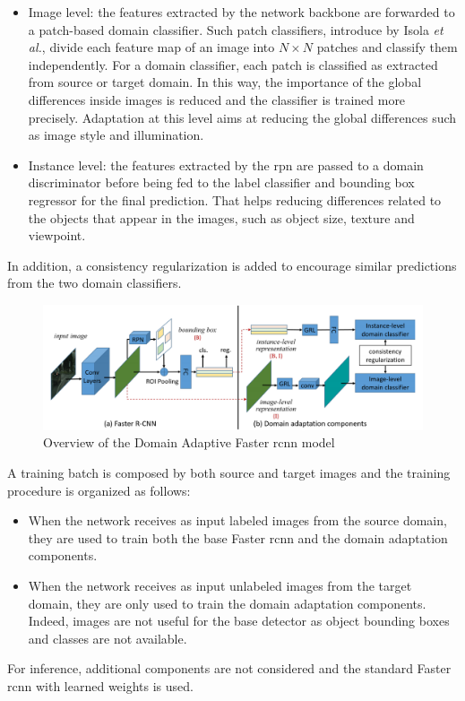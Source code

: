 \documentclass[%
    corpo=12pt,
    twoside,
    stile=classica,   
    tipotesi=magistrale,
    evenboxes,
    english
]{toptesi}
\begin{document}
\begin{itemize}
	\item Image level: the features extracted by the network backbone are forwarded to a patch-based domain classifier. Such patch classifiers, introduce by Isola \textit{et al.}\cite{isola2018imagetoimage}, divide each feature map of an image into $ N\times N $ patches and classify them independently. For a domain classifier, each patch is classified as extracted from source or target domain. In this way, the importance of the global differences inside images is reduced and the classifier is trained more precisely. Adaptation at this level aims at reducing the global differences such as image style and illumination.
	\item Instance level: the features extracted by the \gls{rpn} are passed to a domain discriminator before being fed to the label classifier and bounding box regressor for the final prediction. That helps reducing differences related to the objects that appear in the images, such as object size, texture and viewpoint.
\end{itemize}
In addition, a consistency regularization is added to encourage similar predictions from the two domain classifiers.

\begin{figure}[ht!]
	\centering
	\includegraphics[width=0.9\linewidth]{imgs/dafasterrcnn.png}
	\caption{Overview of the Domain Adaptive Faster \gls{rcnn} model\cite{chen2018domain}}
	\label{fig:dafasterrcnn}
\end{figure}

A training batch is composed by both source and target images and the training procedure is organized as follows:
\begin{itemize}
	\item When the network receives as input labeled images from the source domain, they are used to train both the base Faster \gls{rcnn} and the domain adaptation components.
	\item When the network receives as input unlabeled images from the target domain, they are only used to train the domain adaptation components. Indeed, images are not useful for the base detector as object bounding boxes and classes are not available.
\end{itemize}
For inference, additional components are not considered and the standard Faster \gls{rcnn} with learned weights is used.
\end{document}
